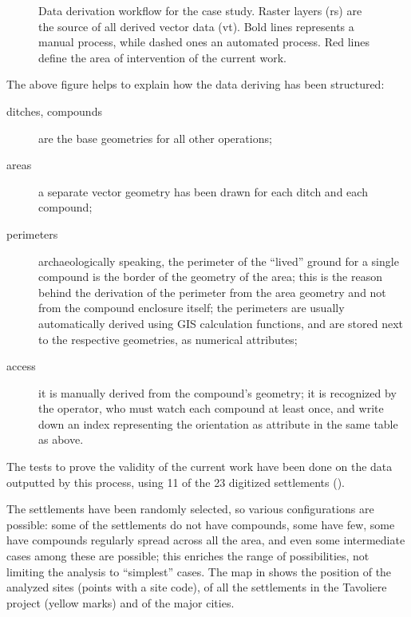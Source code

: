             \begin{figure}[H]
                \caption[Data deriving workflow for the Tavoliere project]{Data derivation workflow for the case study. Raster layers (\textsf{rs}) are the source of all derived vector data (\textsf{vt}). Bold lines represents a manual process, while dashed ones an automated process. Red lines define the area of intervention of the current work.}
                \label{fig:scheme-derive}
            \end{figure}

            The above figure helps to explain how the data deriving has been structured:

            \begin{description}
                \item[ditches, compounds] are the base geometries for all other operations;
                \item[areas] a separate vector geometry has been drawn for each ditch and each compound;
                \item[perimeters] archaeologically speaking, the perimeter of the ``lived'' ground for a single compound is the border of the geometry of the area; this is the reason behind the derivation of the perimeter from the area geometry and not from the compound enclosure itself; the perimeters are usually automatically derived using GIS calculation functions, and are stored next to the respective geometries, as numerical attributes;
                \item[access] it is manually derived from the compound's geometry; it is recognized by the operator, who must watch each compound at least once, and write down an index representing the orientation as attribute in the same table as above.
            \end{description}

            The tests to prove the validity of the current work have been done on the data outputted by this process, using 11 of the 23 digitized settlements ().
            
            
            
            The settlements have been randomly selected, so various configurations are possible: some of the settlements do not have compounds, some have few, some have compounds regularly spread across all the area, and even some intermediate cases among these are possible; this enriches the range of possibilities, not limiting the analysis to ``simplest'' cases. The map in  shows the position of the analyzed sites (points with a site code), of all the settlements in the Tavoliere project (yellow marks) and of the major cities.

